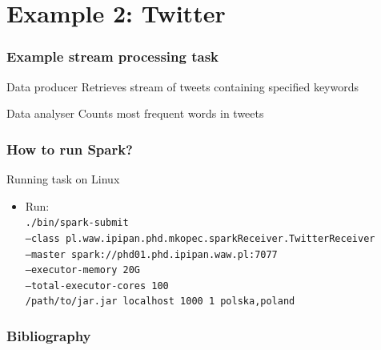 \documentclass{beamer}
\begin{document}
\section{Example 2: Twitter}
\begin{frame}
\frametitle{Example stream processing task}
\begin{block}{Data producer}
	Retrieves stream of tweets containing specified keywords
\end{block}
\begin{block}{Data analyser}
	Counts most frequent words in tweets
\end{block}
\end{frame}

\begin{frame}[allowframebreaks]
\frametitle{How to run Spark?}

\begin{block}{Running task on Linux}
	\begin{itemize}
		\item Run: \\
		\texttt{./bin/spark-submit \\
  --class pl.waw.ipipan.phd.mkopec.sparkReceiver.TwitterReceiver \\
  --master spark://phd01.phd.ipipan.waw.pl:7077 \\
  --executor-memory 20G \\
  --total-executor-cores 100 \\
  /path/to/jar.jar localhost 1000 1 polska,poland}
	\end{itemize}
\end{block}

\end{frame}

\begin{frame}[allowframebreaks]
	\frametitle<presentation>{Bibliography}
	\nocite{*}
	
	\tiny
	
\end{frame}
\end{document}
